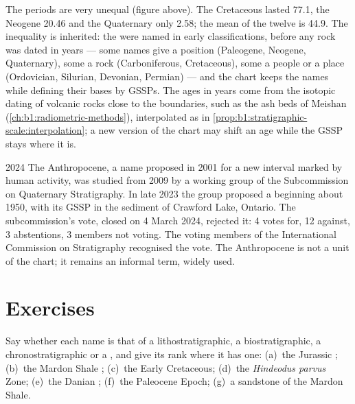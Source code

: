 The periods are very unequal (figure above). The Cretaceous lasted
\qty{77.1}{\Myr}, the Neogene \qty{20.46}{\Myr} and the Quaternary only
\qty{2.58}{\Myr}; the mean of the twelve is \qty{44.9}{\Myr}. The inequality is
inherited: the  were named in early classifications, before any rock was
dated in years --- some names give a position (Paleogene, Neogene, Quaternary),
some a rock (Carboniferous, Cretaceous), some a people or a place (Ordovician,
Silurian, Devonian, Permian) --- and the chart keeps the names while defining
their bases by GSSPs. The ages in years come from the isotopic dating of
volcanic rocks close to the boundaries, such as the ash beds of Meishan
(\cref{ch:b1:radiometric-methods}), interpolated as in
\cref{prop:b1:stratigraphic-scale:interpolation}; a new version of the chart may
shift an age while the GSSP stays where it is.

\begin{dated}{2024}
The Anthropocene, a name proposed in 2001 for a new interval marked by human
activity, was studied from 2009 by a working group of the Subcommission on
Quaternary Stratigraphy. In late 2023 the group proposed a  beginning
about 1950, with its GSSP in the sediment of Crawford Lake, Ontario. The
subcommission's vote, closed on 4 March 2024, rejected it: 4 votes for, 12
against, 3 abstentions, 3 members not voting. The voting members of the
International Commission on Stratigraphy recognised the vote. The Anthropocene
is not a unit of the chart; it remains an informal term, widely used.
\end{dated}

\section{Exercises}

\begin{exercise}[$\star$]\label{exo:b1:stratigraphic-scale:1}
Say whether each name is that of a lithostratigraphic, a biostratigraphic, a
chronostratigraphic or a , and give its rank where it has
one: (a)~the Jurassic ; (b)~the Mardon Shale ; (c)~the Early
Cretaceous; (d)~the \emph{Hindeodus parvus} Zone; (e)~the Danian ;
(f)~the Paleocene Epoch; (g)~a sandstone  of the Mardon Shale.
\end{exercise}

